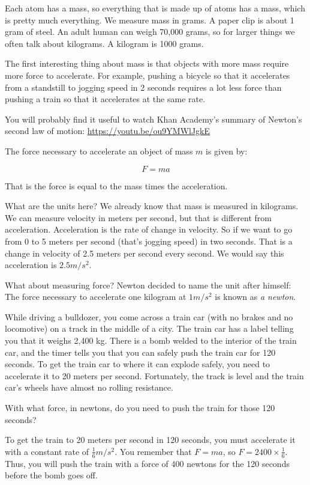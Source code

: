 Each atom has a mass, so everything that is made up of atoms has a
mass, which is pretty much everything.  We measure mass in grams.  A
paper clip is about 1 gram of steel. An adult human can weigh 70,000
grams, so for larger things we often talk about kilograms. A kilogram
is 1000 grams.

The first interesting thing about mass is that objects with more mass
require more force to accelerate. For example, pushing a bicycle so
that it accelerates from a standstill to jogging speed in 2 seconds
requires a lot less force than pushing a train so that it accelerates
at the same rate.

You will probably find it useful to watch Khan Academy's summary of
Newton's second law of motion: \url{https://youtu.be/ou9YMWlJgkE}

\begin{mdframed}[style=important, frametitle={Newton's Second Law of Motion}]

The force necessary to accelerate an object of mass $m$ is given by:

$$F = m a$$

That is the force is equal to the mass times the acceleration.

\end{mdframed}

What are the units here? We already know that mass is measured in
kilograms. We can measure velocity in meters per second, but that is
different from acceleration. Acceleration is the rate of change in
velocity. So if we want to go from 0 to 5 meters per second (that's
jogging speed) in two seconds. That is a change in velocity of 2.5
meters per second every second. We would say this acceleration is $2.5
m/s^2$.

What about measuring force? Newton decided to name the unit after
himself: The force necessary to accelerate one kilogram at $1 m/s^2$
is known as \textit{a newton}.

\begin{Exercise}[title={Acceleration}, label=acceleration_train]
  
While driving a bulldozer, you come across a train car (with no brakes
and no locomotive) on a track in the middle of a city. The train car
has a label telling you that it weighs 2,400 kg. There is a bomb
welded to the interior of the train car, and the timer tells you that
you can safely push the train car for 120 seconds. To get the train
car to where it can explode safely, you need to accelerate it to 20 meters per
second. Fortunately, the track is level and the train car's wheels have
almost no rolling resistance.

With what force, in newtons, do you need to push the train for those 120 seconds?

\end{Exercise}
\begin{Answer}[ref=acceleration_train]
To get the train to 20 meters per second in 120 seconds, you must
accelerate it with a constant rate of $\frac{1}{6} m/s^2$. You
remember that $F = m a$, so $F = 2400 \times \frac{1}{6}$. Thus, you
will push the train with a force of 400 newtons for the 120 seconds
before the bomb goes off.
\end{Answer}


